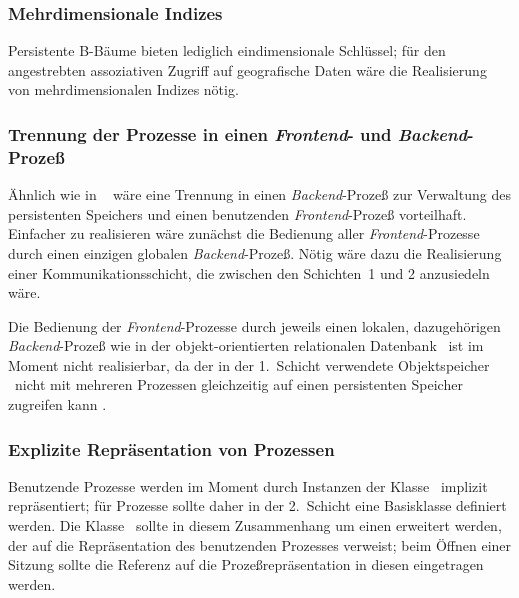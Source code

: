 \subsubsection{Mehrdimensionale Indizes}
%
Persistente B-B\"{a}ume bieten lediglich eindimensionale Schl\"{u}ssel; f\"{u}r
den angestrebten assoziativen Zugriff auf geografische Daten w\"{a}re die
Realisierung von mehrdimensionalen Indizes n\"{o}tig.
%
\subsubsection{Trennung der Prozesse in einen {\em
Frontend\/}- und {\em Backend\/}-Proze\ss{}}
%
\"{A}hnlich wie in \postgres\ \cite[]{bib:we93} w\"{a}re eine
Trennung in einen {\em Backend\/}-Proze\ss{} zur Verwaltung des
persistenten Speichers und einen benutzenden {\em Frontend\/}-Proze\ss{}
vorteilhaft. Einfacher zu realisieren w\"{a}re zun\"{a}chst die Bedienung
aller {\em Frontend\/}-Prozesse durch einen einzigen globalen {\em
Backend\/}-Proze\ss{}. N\"{o}tig w\"{a}re dazu die Realisierung einer
Kommunikationsschicht, die zwischen den Schichten~1 und 2 anzusiedeln
w\"{a}re.
%
\par{}Die Bedienung der {\em Frontend\/}-Prozesse durch jeweils einen 
lokalen, dazugeh\"{o}rigen {\em Backend\/}-Proze\ss{} wie in der
objekt-orientierten relationalen Datenbank \postgres\ ist im Moment
nicht realisierbar, da der in der 1.~Schicht verwendete Objektspeicher
\postore\ nicht mit mehreren Prozessen gleichzeitig auf einen
persistenten Speicher zugreifen kann \cite[]{bib:br92}.
%
\subsubsection{Explizite Repr\"{a}sentation von Prozessen}
%
Benutzende Prozesse werden im Moment durch Instanzen der Klasse
\ implizit repr\"{a}sentiert; f\"{u}r Prozesse sollte
daher in der 2.~Schicht eine Basisklasse definiert werden. Die Klasse
\ sollte in diesem Zusammenhang um einen
\Slt\/ erweitert werden, der auf die Repr\"{a}sentation des benutzenden
Prozesses verweist; beim \"{O}ffnen einer Sitzung sollte die Referenz
auf die Proze\ss{}repr\"{a}sentation in diesen \Slt\/ eingetragen werden.

